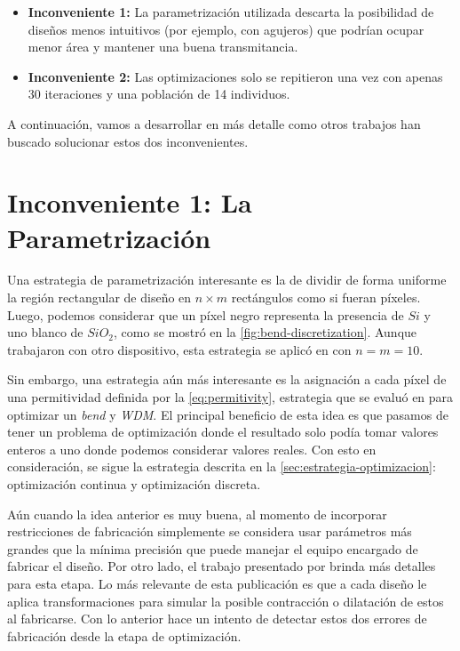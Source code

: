 \begin{itemize}
  \item \textbf{Inconveniente 1:} 
  La parametrización utilizada descarta la posibilidad de diseños menos 
  intuitivos (por ejemplo, con agujeros) que podrían ocupar menor área y mantener una buena transmitancia.
  
  \item \textbf{Inconveniente 2:}
  Las optimizaciones solo se repitieron una vez con apenas 30 iteraciones y una población de 14 individuos.

\end{itemize}


A continuación, vamos a desarrollar en más detalle como otros trabajos han buscado solucionar estos dos inconvenientes.

\section{Inconveniente 1: La Parametrización}

Una estrategia de parametrización interesante es la de dividir de forma uniforme la región rectangular de diseño en 
$n \times m$ rectángulos como si fueran píxeles.
Luego, podemos considerar que un píxel negro representa la presencia de $Si$ y uno blanco de $SiO_2$,
como se mostró en la \autoref{fig:bend-discretization}.
Aunque trabajaron con otro dispositivo, esta estrategia se aplicó en \cite{Malheiros-Silveira2020} con $n
= m = 10$.

Sin embargo, una estrategia aún más interesante es la asignación a cada píxel de una permitividad
definida por la \autoref{eq:permitivity}, estrategia que se evaluó en \cite{Su2020} para optimizar un
\emph{bend} y \emph{WDM}. 
El principal beneficio de esta idea es que pasamos de tener un problema de optimización donde el resultado
solo podía tomar valores enteros a uno donde podemos considerar valores reales.
Con esto en consideración, se sigue la estrategia descrita en la \autoref{sec:estrategia-optimizacion}:
optimización continua y optimización discreta. 

Aún cuando la idea anterior es muy buena, al momento de incorporar restricciones de fabricación simplemente se
considera usar parámetros más grandes que la mínima precisión que puede manejar el equipo encargado de
fabricar el diseño.
Por otro lado, el trabajo presentado por \cite{Hammond20} brinda más detalles para esta etapa.
Lo más relevante de esta publicación es que a cada diseño le aplica transformaciones para simular la posible 
contracción o dilatación de estos al fabricarse.
Con lo anterior hace un intento de detectar estos dos errores de fabricación desde la etapa de optimización.

